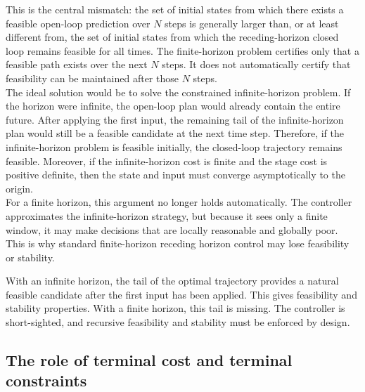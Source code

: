 This is the central mismatch: the set of initial states from which there exists a feasible
open-loop prediction over \(N\) steps is generally larger than, or at least different from, the set of
initial states from which the receding-horizon closed loop remains feasible for all times. The
finite-horizon problem certifies only that a feasible path exists over the next \(N\) steps. It does
not automatically certify that feasibility can be maintained after those \(N\) steps.\\

The ideal solution would be to solve the constrained infinite-horizon problem. If the horizon
were infinite, the open-loop plan would already contain the entire future. After applying the
first input, the remaining tail of the infinite-horizon plan would still be a feasible candidate at
the next time step. Therefore, if the infinite-horizon problem is feasible initially, the closed-loop
trajectory remains feasible. Moreover, if the infinite-horizon cost is finite and the stage cost is
positive definite, then the state and input must converge asymptotically to the origin.\\

For a finite horizon, this argument no longer holds automatically. The controller approximates
the infinite-horizon strategy, but because it sees only a finite window, it may make decisions
that are locally reasonable and globally poor. This is why standard finite-horizon receding
horizon control may lose feasibility or stability.

\begin{theorembox}
With an infinite horizon, the tail of the optimal trajectory provides a natural feasible candidate
after the first input has been applied. This gives feasibility and stability properties. With a
finite horizon, this tail is missing. The controller is short-sighted, and recursive feasibility and
stability must be enforced by design.
\end{theorembox}

\subsection{The role of terminal cost and terminal constraints}

